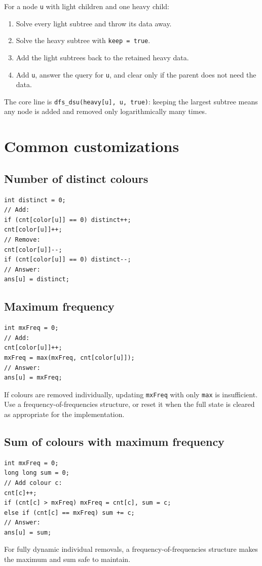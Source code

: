For a node \texttt{u} with light children and one heavy child:
\begin{enumerate}
\item Solve every light subtree and throw its data away.
\item Solve the heavy subtree with \texttt{keep = true}.
\item Add the light subtrees back to the retained heavy data.
\item Add \texttt{u}, answer the query for \texttt{u}, and clear only if the parent does not need the data.
\end{enumerate}
The core line is \texttt{dfs\_dsu(heavy[u], u, true)}: keeping the largest subtree means any node is added and removed only logarithmically many times.

\section{Common customizations}

\subsection{Number of distinct colours}
\begin{lstlisting}
int distinct = 0;
// Add:
if (cnt[color[u]] == 0) distinct++;
cnt[color[u]]++;
// Remove:
cnt[color[u]]--;
if (cnt[color[u]] == 0) distinct--;
// Answer:
ans[u] = distinct;
\end{lstlisting}

\subsection{Maximum frequency}
\begin{lstlisting}
int mxFreq = 0;
// Add:
cnt[color[u]]++;
mxFreq = max(mxFreq, cnt[color[u]]);
// Answer:
ans[u] = mxFreq;
\end{lstlisting}
If colours are removed individually, updating \texttt{mxFreq} with only \texttt{max} is insufficient. Use a frequency-of-frequencies structure, or reset it when the full state is cleared as appropriate for the implementation.

\subsection{Sum of colours with maximum frequency}
\begin{lstlisting}
int mxFreq = 0;
long long sum = 0;
// Add colour c:
cnt[c]++;
if (cnt[c] > mxFreq) mxFreq = cnt[c], sum = c;
else if (cnt[c] == mxFreq) sum += c;
// Answer:
ans[u] = sum;
\end{lstlisting}
For fully dynamic individual removals, a frequency-of-frequencies structure makes the maximum and sum safe to maintain.

